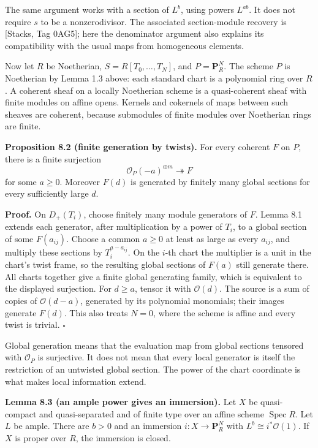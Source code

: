 \documentclass[11pt,a4paper,openany]{report}
\begin{document}
The same argument works with a section of \(L^b\), using powers \(L^{ab}\). It does not require \(s\) to be a nonzerodivisor. The associated section-module recovery is {[}Stacks, Tag 0AG5{]}; here the denominator argument also explains its compatibility with the usual maps from homogeneous elements.

Now let \(R\) be Noetherian, \(S=R[T_0,\ldots,T_N]\), and \(P=\mathbf P_R^N\). The scheme \(P\) is Noetherian by Lemma 1.3 above: each standard chart is a polynomial ring over \(R\). A coherent sheaf on a locally Noetherian scheme is a quasi-coherent sheaf with finite modules on affine opens. Kernels and cokernels of maps between such sheaves are coherent, because submodules of finite modules over Noetherian rings are finite.

\textbf{Proposition 8.2 (finite generation by twists).} For every coherent \(F\) on \(P\), there is a finite surjection \[
\mathcal O_P(-a)^{\oplus m}\twoheadrightarrow F
\] for some \(a\ge0\). Moreover \(F(d)\) is generated by finitely many global sections for every sufficiently large \(d\).

\textbf{Proof.} On \(D_+(T_i)\), choose finitely many module generators of \(F\). Lemma 8.1 extends each generator, after multiplication by a power of \(T_i\), to a global section of some \(F(a_{ij})\). Choose a common \(a\ge0\) at least as large as every \(a_{ij}\), and multiply these sections by \(T_i^{a-a_{ij}}\). On the \(i\)-th chart the multiplier is a unit in the chart's twist frame, so the resulting global sections of \(F(a)\) still generate there. All charts together give a finite global generating family, which is equivalent to the displayed surjection. For \(d\ge a\), tensor it with \(\mathcal O(d)\). The source is a sum of copies of \(\mathcal O(d-a)\), generated by its polynomial monomials; their images generate \(F(d)\). This also treats \(N=0\), where the scheme is affine and every twist is trivial. \(\square\)

Global generation means that the evaluation map from global sections tensored with \(\mathcal O_P\) is surjective. It does not mean that every local generator is itself the restriction of an untwisted global section. The power of the chart coordinate is what makes local information extend.

\textbf{Lemma 8.3 (an ample power gives an immersion).} Let \(X\) be quasi-compact and quasi-separated and of finite type over an affine scheme \(\operatorname{Spec}R\). Let \(L\) be ample. There are \(b>0\) and an immersion \(i:X\to\mathbf P_R^N\) with \(L^b\cong i^*\mathcal O(1)\). If \(X\) is proper over \(R\), the immersion is closed.
\end{document}
